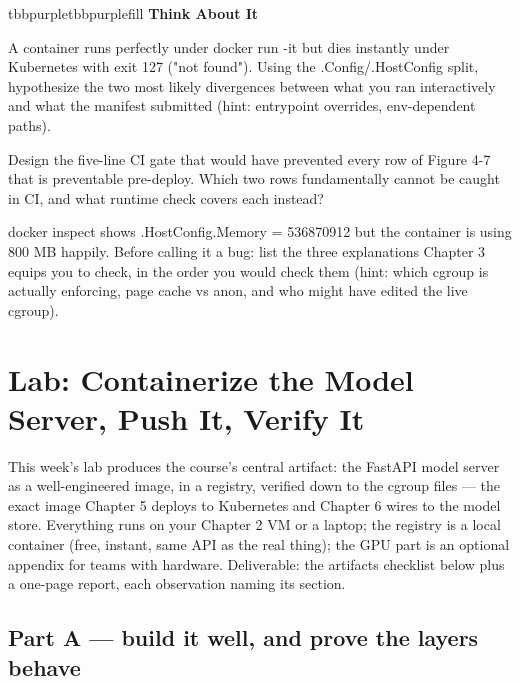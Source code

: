 \begin{calloutbox}{tbbpurple}{tbbpurplefill}
{\normalsize\bfseries\color{tbbpurple}Think About It}\par\vspace{3pt}
\begin{tbbitemize}
  \item A container runs perfectly under docker run -it but dies instantly under Kubernetes with exit 127 ("not found"). Using the .Config/.HostConfig split, hypothesize the two most likely divergences between what you ran interactively and what the manifest submitted (hint: entrypoint overrides, env-dependent paths).
  \item Design the five-line CI gate that would have prevented every row of Figure 4-7 that is preventable pre-deploy. Which two rows fundamentally cannot be caught in CI, and what runtime check covers each instead?
  \item docker inspect shows .HostConfig.Memory = 536870912 but the container is using 800 MB happily. Before calling it a bug: list the three explanations Chapter 3 equips you to check, in the order you would check them (hint: which cgroup is actually enforcing, page cache vs anon, and who might have edited the live cgroup).
\end{tbbitemize}
\end{calloutbox}

\section{Lab: Containerize the Model Server, Push It, Verify It}

This week's lab produces the course's central artifact: the FastAPI model server as a well-engineered image, in a registry, verified down to the cgroup files — the exact image Chapter 5 deploys to Kubernetes and Chapter 6 wires to the model store. Everything runs on your Chapter 2 VM or a laptop; the registry is a local  container (free, instant, same API as the real thing); the GPU part is an optional appendix for teams with hardware. Deliverable: the artifacts checklist below plus a one-page report, each observation naming its section.

\subsection*{Part A — build it well, and prove the layers behave}

